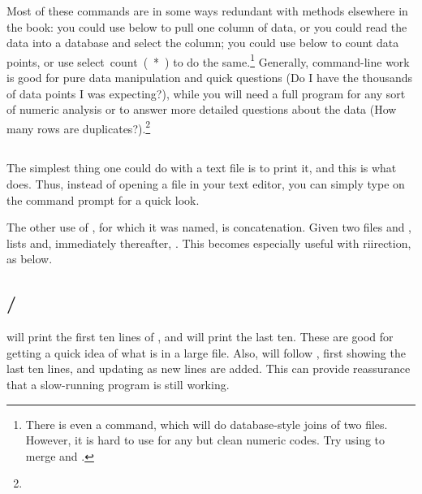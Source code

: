 Most of these commands are in some ways redundant with methods
elsewhere in the book: you could use  below to pull one column
of data, or you could read the data into a database and \si{select}
the column; you could use  below to count data points, or use
\si{select count(*)} to do the same.\footnote{
There is even a 
command, which will do database-style joins of two files. However, it is
hard to use for any but clean numeric codes. Try using  to
merge  and .} Generally, 
command-line work is good for pure data manipulation and quick questions (Do I have the thousands 
of data points I was expecting?), while you will need a full program 
for any sort of numeric analysis or to answer more detailed questions
about the data (How many rows are
duplicates?).\footnote{}

\subsection{} The simplest thing one could do with a text file is 
to print it, and this is what  does. Thus, instead of opening a
file in your text editor, you can simply type  on
the command prompt for a quick look.

The other use of , for which it was named, is concatenation.
Given two files  and ,  lists  and,
immediately thereafter, . This becomes especially useful with
riirection, as below.

\subsection{/}  will print the
first ten lines of
, and  will print the last ten. These are
good for getting a quick idea of what is in a large file.  Also,
 will follow , first showing the
last ten lines, and updating as new lines are added. This can provide
reassurance that a slow-running program is still working.



